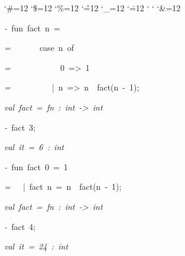 \begin{list}{}
{\setlength{\leftmargin}{\leftmargini}
\setlength{\rightmargin}{0cm}
\setlength{\itemindent}{0cm}
\setlength{\listparindent}{0cm}
\setlength{\itemsep}{0cm}
\setlength{\parsep}{0cm}
\setlength{\labelsep}{0cm}
\setlength{\labelwidth}{0cm}
\catcode`\#=12
\catcode`\$=12
\catcode`\%=12
\catcode`\^=12
\catcode`\_=12
\catcode`\.=12
\catcode`
\catcode`
\catcode`\&=12
\ttfamily}
\small
\item[]\textsl{-\ }fun\ fact\ n\ =
\item[]\textsl{=\ }\ \ \ \ \ \ case\ n\ of
\item[]\textsl{=\ }\ \ \ \ \ \ \ \ \ \ \ 0\ =>\ 1
\item[]\textsl{=\ }\ \ \ \ \ \ \ \ \ |\ n\ =>\ n\ \ fact(n\ -\ 1);
\item[]\textsl{val\ fact\ =\ fn\ :\ int\ ->\ int}
\item[]\textsl{-\ }fact\ 3;
\item[]\textsl{val\ it\ =\ 6\ :\ int}
\item[]\textsl{-\ }fun\ fact\ 0\ =\ 1
\item[]\textsl{=\ }\ \ |\ fact\ n\ =\ n\ \ fact(n\ -\ 1);
\item[]\textsl{val\ fact\ =\ fn\ :\ int\ ->\ int}
\item[]\textsl{-\ }fact\ 4;
\item[]\textsl{val\ it\ =\ 24\ :\ int}
\end{list}
